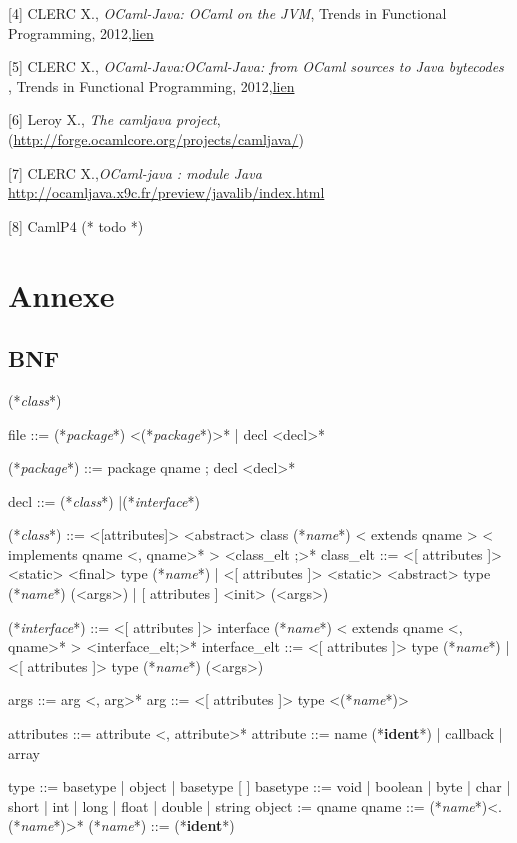 \documentclass[a4paper, 11pt, notitlepage]{article}
\newcommand{\class}{\ttfamily\textit{class}}
\newcommand{\interface}{\ttfamily\textit{interface}}
\newcommand{\name}{\ttfamily\textit{name}}
\newcommand{\package}{\ttfamily\textit{package}}
\newcommand{\ident}{\footnotesize\textbf{ident}}
\begin{document}
[4] CLERC X., \emph{OCaml-Java: OCaml on the JVM}, Trends in
Functional Programming,
2012,\href{}{lien}

[5] CLERC X., \emph{OCaml-Java:OCaml-Java: from OCaml sources to Java bytecodes }, Trends in Functional Programming, 2012,\href{http://www.lexifi.com/ml2012/full9.pdf}{lien}

[6] Leroy X., \emph{The camljava project},
(\url{http://forge.ocamlcore.org/projects/camljava/})

[7] CLERC X.,\emph{OCaml-java : module Java} \url{http://ocamljava.x9c.fr/preview/javalib/index.html}

[8] CamlP4 (* todo *)











\newpage
\section*{Annexe}


\subsection*{BNF}
\begin{idl}
(*\class*)

file ::= (*\package*) <(*\package*)>*
  	| decl <decl>*
 
(*\package*) ::= package qname ; decl <decl>*

decl ::= (*\class*)
  	|(*\interface*)
 
(*\class*) ::= <[attributes]> <abstract> class (*\name*)
  	  < extends qname >
  	  < implements qname <, qname>* >
  	  { <class_elt ;>* }
class_elt ::= <[ attributes ]> <static> <final> type (*\name*)
            | <[ attributes ]> <static> <abstract> type (*\name*) (<args>)
            | [ attributes ] <init> (<args>)
 
(*\interface*) ::= <[ attributes ]> interface (*\name*)
  	       < extends qname <, qname>* >
  	      { <interface_elt;>* }
interface_elt ::= 
     <[ attributes ]> type (*\name*)
   | <[ attributes ]> type (*\name*) (<args>)
 
args ::= arg <, arg>*
arg ::= <[ attributes ]> type <(*\name*)>
 
attributes ::= 	attribute <, attribute>*
attribute ::= name (*\ident*)
  	    | callback
  	    | array
 
type ::= basetype
       | object
       | basetype [ ]
basetype ::= void
           | boolean
           | byte
           | char
           | short
           | int
           | long
           | float
           | double
           | string
object := qname
qname ::= (*\name*)<.(*\name*)>*
(*\name*) ::= (*\ident*)
\end{idl}
\end{document}
